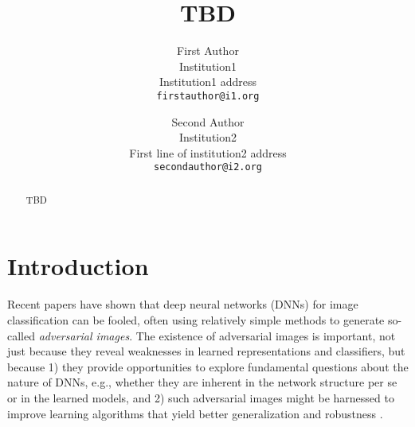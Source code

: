 \documentclass[10pt,twocolumn,letterpaper]{article}
\begin{document}
\title{TBD}

\author{First Author\\
Institution1\\
Institution1 address\\
{\tt\small firstauthor@i1.org}
\and
Second Author\\
Institution2\\
First line of institution2 address\\
{\tt\small secondauthor@i2.org}
}

\maketitle

\begin{abstract}
TBD
\end{abstract}

\section{Introduction}\vspace*{-0.1cm}%

Recent papers have shown that deep neural networks (DNNs) for image 
classification can be fooled, often using relatively simple methods to
generate so-called {\em adversarial images}\citep{FawziEtalICLR2015, GoodfellowEtalICLR2015, GuRigazioNIPSWorkshop2014, 
NguyenEtAlCVPR2015, SzegedyElatICLR2014, Tabacof2015exploring}. 
The existence of adversarial images is important, not 
just because they reveal weaknesses in learned representations 
and classifiers, but because 1) they provide opportunities to explore 
fundamental questions about the nature of DNNs, e.g., whether they are 
inherent in the network structure per se or in the learned models, and 
2) such adversarial images might be harnessed to improve learning 
algorithms that yield better generalization and robustness 
\citep{GoodfellowEtalICLR2015, GuRigazioNIPSWorkshop2014}.
\end{document}
